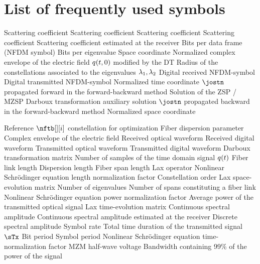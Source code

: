\chapter{List of frequently used symbols}

\begin{enumerate}[wide=0pt, labelwidth=4em, align=left]

\symb{\nfta} Scattering coefficient
\symb{\nftaconj}  Scattering coefficient
\symb{\nftb} Scattering coefficient
\symb{\nftbconj}  Scattering coefficient
\symb{\nftbest}  Scattering coefficient estimated at the receiver
 Bits per data frame (\acs{NFDM} symbol)
 Bits per eigenvalue
\symb{\ssp}  Space coordinate
\symb{\nfldl}  Normalized complex envelope of the electric field
\symb{\nfldsmod}  $\nfld(\nttm, 0)$ modified by the \acs{DT}
 Radius of the constellations associated to the eigenvalues $\eig[1], \eig[2]$
 Digital received \acs{NFDM}-symbol
 Digital transmitted \acs{NFDM}-symbol
\symb{\nttm}  Normalized time coordinate
\symb{\fbu}  $\jostn$ propagated forward  in the forward-backward method
\symb{\eigf}  Solution of the \acs{ZSP} / \acs{MZSP}
\symb{\auxsol}  Darboux transformation auxiliary solution
\symb{\fbw}  $\jostn$ propagated backward in the forward-backward method
\symb{\nssp}  Normalized space coordinate

 Reference $\nftb[][i]$ constellation for optimization
 Fiber dispersion parameter
\symb{\fld(\ttm,\ssp)}  Complex envelope of the electric field
\symb{\sRx} Received optical waveform
\symb{\sdRx}  Received digital waveform
\symb{\sTx}  Transmitted optical waveform
\symb{\sdTx}  Transmitted digital waveform
 Darboux transformation matrix
 Number of samples of the time domain signal $\nflds$
\symb{\fiberl}   Fiber link length
 Dispersion length
\symb{\spanl} Fiber span length
\symb{\matL} Lax operator
\symb{\nftcvL}  Nonlinear Schr\"odinger equation length normalization factor
 Constellation order
\symb{\matM} Lax space-evolution matrix
\symb{\nEig} Number of eigenvalues
\symb{\nspans} Number of spans constituting a fiber link
 Nonlinear Schr\"odinger equation power normalization factor
 Average power of the transmitted optical signal
\symb{\matP} Lax time-evolution matrix
\symb{\cnftsp,\nssp)}  Continuous spectral amplitude
\symb{\cnftest}  Continuous spectral amplitude estimated at the receiver
\symb{\dnftsp,\nssp)}  Discrete  spectral amplitude
\symbt{\Rs}  Symbol rate
 Total time duration of the transmitted signal $\sTx$
 Bit period
\symbt{\Ts}  Symbol period
\symbt{\To}  Nonlinear Schr\"odinger equation time-normalization factor
 \acl{MZM} half-wave voltage
 Bandwidth containing 99\% of the power of the signal



\end{enumerate}

